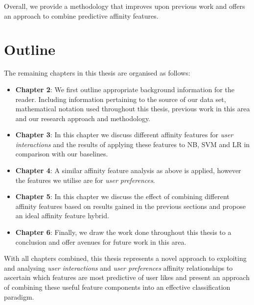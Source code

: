 Overall, we provide a methodology that improves upon previous work and offers an approach to combine predictive affinity features.

\section{Outline}
\label{sec:outline}

The remaining chapters in this thesis are organised as follows:
\begin{itemize}
\item \textbf{Chapter 2}: We first outline appropriate background information for the reader. Including information pertaining to the source of 
our data set, mathematical notation used throughout this thesis, previous work in this area and our research approach and methodology.
\item \textbf{Chapter 3}: In this chapter we discuss different affinity features for \emph{user interactions} and the results of applying these features to NB, SVM and LR 
in comparison with our baselines.
\item \textbf{Chapter 4}: A similar affinity feature analysis as above is applied, however the features we utilise are for \emph{user preferences}.
\item \textbf{Chapter 5}: In this chapter we discuss the effect of combining different affinity features based on results gained in the previous sections
and propose an ideal affinity feature hybrid.
\item \textbf{Chapter 6}: Finally, we draw the work done throughout this thesis to a conclusion and offer avenues for future work in this area.
\end{itemize}

With all chapters combined, this thesis represents a novel approach to exploiting and analysing \emph{user interactions} and \emph{user preferences} affinity relationships
to ascertain which features are most predictive of user likes and present an approach of combining these useful feature components into an effective 
classification paradigm.

